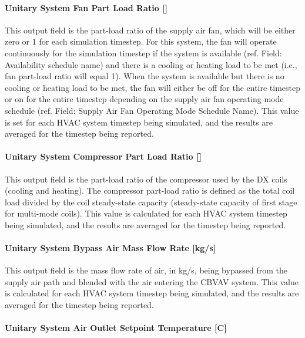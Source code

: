 \paragraph{Unitary System Fan Part Load Ratio {[]}}\label{unitary-system-fan-part-load-ratio-8}

This output field is the part-load ratio of the supply air fan, which will be either zero or 1 for each simulation timestep. For this system, the fan will operate continuously for the simulation timestep if the system is available (ref. Field: Availability schedule name) and there is a cooling or heating load to be met (i.e., fan part-load ratio will equal 1). When the system is available but there is no cooling or heating load to be met, the fan will either be off for the entire timestep or on for the entire timestep depending on the supply air fan operating mode schedule (ref. Field: Supply Air Fan Operating Mode Schedule Name). This value is set for each HVAC system timestep being simulated, and the results are averaged for the timestep being reported.

\paragraph{Unitary System Compressor Part Load Ratio {[]}}\label{unitary-system-compressor-part-load-ratio-5}

This output field is the part-load ratio of the compressor used by the DX coils (cooling and heating). The compressor part-load ratio is defined as the total coil load divided by the coil steady-state capacity (steady-state capacity of first stage for multi-mode coils). This value is calculated for each HVAC system timestep being simulated, and the results are averaged for the timestep being reported.

\paragraph{Unitary System Bypass Air Mass Flow Rate {[}kg/s{]}}\label{unitary-system-bypass-air-mass-flow-rate-kgs}

This output field is the mass flow rate of air, in kg/s, being bypassed from the supply air path and blended with the air entering the CBVAV system. This value is calculated for each HVAC system timestep being simulated, and the results are averaged for the timestep being reported.

\paragraph{Unitary System Air Outlet Setpoint Temperature {[}C{]}}\label{unitary-system-air-outlet-setpoint-temperature-c}

